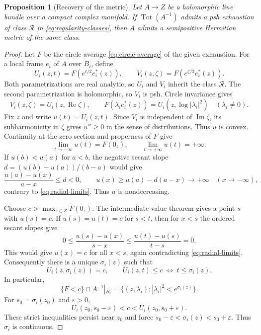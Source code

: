 \documentclass[11pt]{amsart}
\newtheorem{proposition}[theorem]{Proposition}
\theoremstyle{definition}
\theoremstyle{remark}
\numberwithin{equation}{section}
\newcommand{\Tot}{\operatorname{Tot}}
\begin{document}
\begin{proposition}[Recovery of the metric]\label{prop:radius}
Let $A\to Z$ be a holomorphic line bundle over a compact complex
manifold. If $\Tot(A^{-1})$ admits a psh exhaustion of class
$\mathcal R$ in \eqref{eq:regularity-classes}, then $A$ admits a
semipositive Hermitian metric of the same class.
\end{proposition}
\begin{proof}
Let $F$ be the circle average \eqref{eq:circle-average} of the given
exhaustion. For a local frame $e_i$ of $A$ over $B_i$, define
\[
 U_i(z,t)=F(e^{t/2}e_i^*(z)),\qquad
 V_i(z,\zeta)=F(e^{\zeta/2}e_i^*(z)).
\]
Both parametrizations are real analytic, so $U_i$ and $V_i$
inherit the class $\mathcal R$. The second parametrization is
holomorphic, so $V_i$ is psh. Circle invariance gives
\[
 V_i(z,\zeta)=U_i(z,\operatorname{Re}\zeta),\qquad
 F(\lambda_i e_i^*(z))=U_i(z,\log|\lambda_i|^2)
 \quad(\lambda_i\ne0).
\]
Fix $z$ and write $u(t)=U_i(z,t)$. Since $V_i$ is independent of
$\operatorname{Im}\zeta$, its subharmonicity in $\zeta$ gives
$u''\ge0$ in the sense of distributions. Thus $u$ is convex.
Continuity at the zero section and
properness of $F$ give
\begin{equation}\label{eq:radial-limits}
 \lim_{t\to-\infty}u(t)=F(0_z),\qquad
 \lim_{t\to+\infty}u(t)=+\infty.
\end{equation}
If $u(b)<u(a)$ for $a<b$, the negative secant slope
$d=(u(b)-u(a))/(b-a)$ would give
\[
 \frac{u(a)-u(x)}{a-x}\le d<0,\qquad
 u(x)\ge u(a)-d(a-x)\longrightarrow+\infty
 \quad(x\to-\infty),
\]
contrary to \eqref{eq:radial-limits}. Thus $u$ is nondecreasing.

Choose $c>\max_{z\in Z}F(0_z)$. The intermediate value theorem
gives a point $s$ with $u(s)=c$. If $u(s)=u(t)=c$ for $s<t$, then
for $x<s$ the ordered secant slopes give
\[
 0\le\frac{u(s)-u(x)}{s-x}
 \le\frac{u(t)-u(s)}{t-s}=0.
\]
This would give $u(x)=c$ for all $x<s$, again contradicting
\eqref{eq:radial-limits}. Consequently there is a unique
$\sigma_i(z)$ such that
\begin{equation}\label{eq:implicit-radius}
 U_i(z,\sigma_i(z))=c,
 \qquad U_i(z,t)\le c\ \Longleftrightarrow\ t\le\sigma_i(z).
\end{equation}
In particular,
\begin{equation}\label{eq:radius-sublevel}
 \{F<c\}\cap A^{-1}|_{B_i}
 =\{(z,\lambda_i):|\lambda_i|^2<e^{\sigma_i(z)}\}.
\end{equation}
For $s_0=\sigma_i(z_0)$ and $\varepsilon>0$,
\[
 U_i(z_0,s_0-\varepsilon)<c<U_i(z_0,s_0+\varepsilon).
\]
These strict inequalities persist near $z_0$ and force
$s_0-\varepsilon<\sigma_i(z)<s_0+\varepsilon$. Thus $\sigma_i$
is continuous.


\end{proof}
\end{document}
